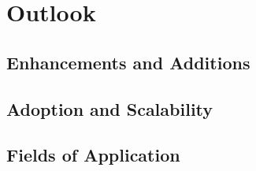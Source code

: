 
\chapter{Outlook}
\label{chp:outlook}

\section{Enhancements and Additions}

\section{Adoption and Scalability}

\section{Fields of Application}

